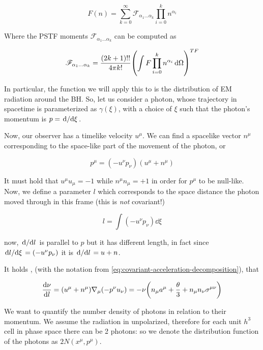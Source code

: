 \documentclass[main.tex]{subfiles}
\begin{document}
\begin{equation}
    F(n) = \sum _{k=0}   ^{\infty}
    \mathscr F_{\alpha_1 \dots \alpha_k} \prod_{i=0}^k n^{\alpha_i}
\end{equation}

Where the PSTF moments \(\mathscr F_{\alpha_1 \dots \alpha_k}\) can be computed as

\begin{equation} \label{eq:PSTF-moments-function-decomposition}
    \mathscr F_{\alpha_1 \dots \alpha_k} =
    \frac{(2k+1)!!}{4 \pi k!} \qty(\int F \prod_{i=0}^k n^{\alpha_i}  \dd{\Omega}  )^{TF}
\end{equation}

In particular, the function we will apply this to is the distribution of EM radiation around the BH. So, let us consider a photon, whose trajectory in spacetime is parameterized as \(\gamma(\xi)\), with a choice of \(\xi\) such that the photon's momentum is
\(
p = \dv*{}{\xi}
\).

Now, our observer has a timelike velocity \(u^\mu\). We can find a spacelike vector \(n^\mu\) corresponding to the space-like part of the movement of the photon, or

\begin{equation}
    p^\mu = (- u^\nu p_\nu) (u^\mu + n^\mu)
\end{equation}

It must hold that \(u^\mu u_\mu = -1 \) while \(n^\mu n_\mu = +1 \) in order for \(p^\mu\) to be null-like.
Now, we define a parameter \(l\) which corresponds to the space distance the photon moved through in this frame (this is \emph{not} covariant!)

\begin{equation}
    l = \int  (-u^\nu p_\nu) \dd{\xi}
\end{equation}

now, \(\dv*{}{l} \) is parallel to \(p\) but it has different length, in fact since \(\dv*{l}{\xi} = (-u^\nu p_\nu) \) it is \(\dv*{}{l} = u + n \).

It holds \cite[eq. 2.17]{Thorne:1981feb}, (with the notation from \eqref{eq:covariant-acceleration-decomposition}),  that

\begin{equation}
  \dv{\nu}{l}  = (u^\mu + n^\mu) \nabla_\mu (-p^\nu u_\nu) = - \nu \qty(n_\mu a^\mu  + \frac{\theta}{3} + n_\mu n_\nu \sigma^{\mu\nu})
\end{equation}

We want to quantify the number density of photons in relation to their momentum. We assume the radiation in unpolarized, therefore for each unit \(h^3\) cell in phase space there can be 2 photons: so we denote the distribution function of the photons as \(2N (x^\mu, p^\mu)\).
\end{document}
